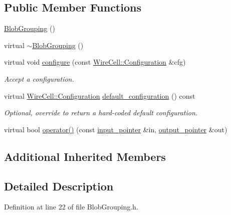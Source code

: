 \subsection*{Public Member Functions}
\begin{DoxyCompactItemize}
\item 
\hyperlink{class_wire_cell_1_1_img_1_1_blob_grouping_afeb80dad72625b35d980d6b8b1bc6ddc}{Blob\+Grouping} ()
\item 
virtual \hyperlink{class_wire_cell_1_1_img_1_1_blob_grouping_a5ec2d54a1818ba07bb89c86f033438ea}{$\sim$\+Blob\+Grouping} ()
\item 
virtual void \hyperlink{class_wire_cell_1_1_img_1_1_blob_grouping_a9c622d1a55969ba5e82b3b6574dd8569}{configure} (const \hyperlink{namespace_wire_cell_a9f705541fc1d46c608b3d32c182333ee}{Wire\+Cell\+::\+Configuration} \&cfg)
\begin{DoxyCompactList}\small\item\em Accept a configuration. \end{DoxyCompactList}\item 
virtual \hyperlink{namespace_wire_cell_a9f705541fc1d46c608b3d32c182333ee}{Wire\+Cell\+::\+Configuration} \hyperlink{class_wire_cell_1_1_img_1_1_blob_grouping_ad09392f57e29c6f6d6f600229aea9d44}{default\+\_\+configuration} () const
\begin{DoxyCompactList}\small\item\em Optional, override to return a hard-\/coded default configuration. \end{DoxyCompactList}\item 
virtual bool \hyperlink{class_wire_cell_1_1_img_1_1_blob_grouping_a88167a4eac6c6c97c550a11cc6a0e093}{operator()} (const \hyperlink{class_wire_cell_1_1_i_function_node_a55c0946156df9b712b8ad1a0b59b2db6}{input\+\_\+pointer} \&in, \hyperlink{class_wire_cell_1_1_i_function_node_afc02f1ec60d31aacddf64963f9ca650b}{output\+\_\+pointer} \&out)
\end{DoxyCompactItemize}
\subsection*{Additional Inherited Members}


\subsection{Detailed Description}


Definition at line 22 of file Blob\+Grouping.\+h.



